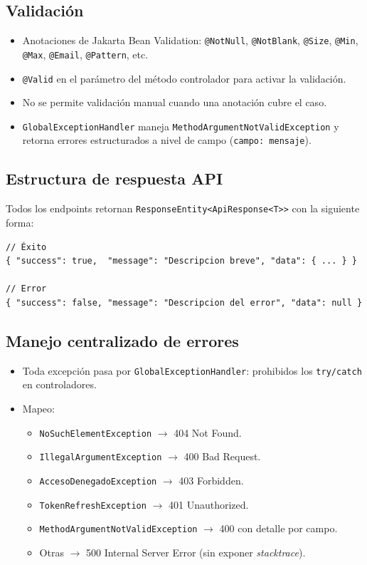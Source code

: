 \documentclass[11pt,a4paper,oneside]{article}
\newcommand{\code}[1]{\texttt{\small #1}}
\begin{document}
\subsection{Validación}

\begin{itemize}[leftmargin=*]
  \item Anotaciones de Jakarta Bean Validation: \code{@NotNull}, \code{@NotBlank}, \code{@Size},
        \code{@Min}, \code{@Max}, \code{@Email}, \code{@Pattern}, etc.
  \item \code{@Valid} en el parámetro del método controlador para activar la validación.
  \item No se permite validación manual cuando una anotación cubre el caso.
  \item \code{GlobalExceptionHandler} maneja \code{MethodArgumentNotValidException} y
        retorna errores estructurados a nivel de campo (\code{campo: mensaje}).
\end{itemize}

\subsection{Estructura de respuesta API}

Todos los endpoints retornan \code{ResponseEntity<ApiResponse<T>>} con la siguiente forma:

\begin{lstlisting}[style=json,caption={Forma del envoltorio \code{ApiResponse} (éxito y error)}]
// Éxito
{ "success": true,  "message": "Descripcion breve", "data": { ... } }

// Error
{ "success": false, "message": "Descripcion del error", "data": null }
\end{lstlisting}

\subsection{Manejo centralizado de errores}

\begin{itemize}[leftmargin=*]
  \item Toda excepción pasa por \code{GlobalExceptionHandler}: prohibidos los \code{try/catch}
        en controladores.
  \item Mapeo:
  \begin{itemize}
    \item \code{NoSuchElementException} $\to$ 404 Not Found.
    \item \code{IllegalArgumentException} $\to$ 400 Bad Request.
    \item \code{AccesoDenegadoException} $\to$ 403 Forbidden.
    \item \code{TokenRefreshException} $\to$ 401 Unauthorized.
    \item \code{MethodArgumentNotValidException} $\to$ 400 con detalle por campo.
    \item Otras $\to$ 500 Internal Server Error (sin exponer \emph{stacktrace}).
  \end{itemize}
\end{itemize}
\end{document}
